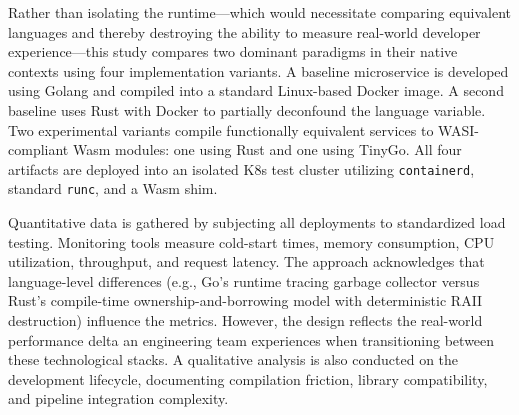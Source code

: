 \begin{sloppypar}
Rather than isolating the runtime---which would necessitate comparing equivalent languages and thereby destroying the ability to measure real-world developer experience---this study compares two dominant paradigms in their native contexts using four implementation variants. A baseline microservice is developed using Golang and compiled into a standard Linux-based Docker image. A second baseline uses Rust with Docker to partially deconfound the language variable. Two experimental variants compile functionally equivalent services to \acs{WASI}-compliant \acs{Wasm} modules: one using Rust and one using TinyGo. All four artifacts are deployed into an isolated \acs{K8s} test cluster utilizing \texttt{containerd}, standard \texttt{runc}, and a \acs{Wasm} shim.
\end{sloppypar}

Quantitative data is gathered by subjecting all deployments to standardized load testing. Monitoring tools measure cold-start times, memory consumption, \acs{CPU} utilization, throughput, and request latency. The approach acknowledges that language-level differences (e.g., Go's runtime tracing garbage collector versus Rust's compile-time ownership-and-borrowing model with deterministic \acs{RAII} destruction) influence the metrics. However, the design reflects the real-world performance delta an engineering team experiences when transitioning between these technological stacks. A qualitative analysis is also conducted on the development lifecycle, documenting compilation friction, library compatibility, and pipeline integration complexity.


